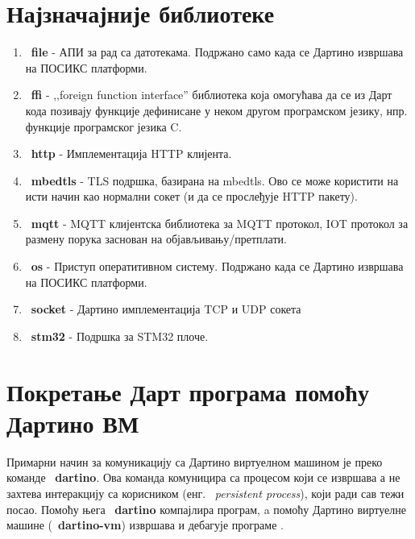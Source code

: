 \documentclass[12pt,oneside]{memoir}
\begin{document}
\section{Најзначајније библиотеке}
\begin{enumerate}

\item ~\textbf{file} - АПИ за рад са датотекама. Подржано само када се Дартино извршава на ПОСИКС платформи.

\item ~\textbf{ffi} - ,,foreign function interface'' библиотека која омогућава да се из Дарт кода позивају функције дефинисане у неком другом програмском језику, нпр. функције програмског језика C.

\item ~\textbf{http} - Имплементација HTTP клијента.

\item ~\textbf{mbedtls} - TLS подршка, базирана на mbedtls. Ово се може користити на исти начин као нормални сокет (и да се прослеђује HTTP пакету).

\item ~\textbf{mqtt} - MQTT клијентска библиотека за MQTT протокол, IOT протокол за размену порука заснован на објављивању/претплати.

\item ~\textbf{os} - Приступ оператитивном систему. Подржано када се Дартино извршава на ПОСИКС платформи.

\item ~\textbf{socket} - Дартино имплементација TCP и UDP сокета

\item ~\textbf{stm32} - Подршка за STM32 плоче.

\end{enumerate}

\section{Покретање Дарт програма помоћу Дартино ВМ}

Примарни начин за комуникацију са Дартино виртуелном машином је преко команде ~\textbf{dartino}. Ова команда комуницира са процесом који се извршава а не захтева интеракцију са корисником (енг. ~\textit{persistent process}), који ради сав тежи посао. Помоћу њега ~\textbf{dartino} компајлира програм, a помоћу Дартино виртуелне машине (~\textbf{dartino-vm}) извршава и дебагује програме .\\
\end{document}
